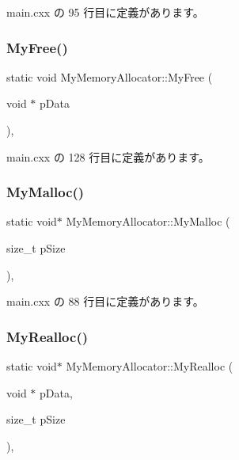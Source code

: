 main.\+cxx の 95 行目に定義があります。

\mbox{\label{class_my_memory_allocator_af96d6b0178ab01af892c68d2cfa23ced}} 
\subsubsection{\texorpdfstring{My\+Free()}{MyFree()}}
{\footnotesize\ttfamily static void My\+Memory\+Allocator\+::\+My\+Free (\begin{DoxyParamCaption}\item[{void $\ast$}]{p\+Data }\end{DoxyParamCaption})\hspace{0.3cm}{\ttfamily [inline]}, {\ttfamily [static]}}



 main.\+cxx の 128 行目に定義があります。

\mbox{\label{class_my_memory_allocator_ab04e127ff4f952b64294f31a80997860}} 
\subsubsection{\texorpdfstring{My\+Malloc()}{MyMalloc()}}
{\footnotesize\ttfamily static void$\ast$ My\+Memory\+Allocator\+::\+My\+Malloc (\begin{DoxyParamCaption}\item[{size\+\_\+t}]{p\+Size }\end{DoxyParamCaption})\hspace{0.3cm}{\ttfamily [inline]}, {\ttfamily [static]}}



 main.\+cxx の 88 行目に定義があります。

\mbox{\label{class_my_memory_allocator_a1ab26aac36e046c768e9a1c8a55d1d32}} 
\subsubsection{\texorpdfstring{My\+Realloc()}{MyRealloc()}}
{\footnotesize\ttfamily static void$\ast$ My\+Memory\+Allocator\+::\+My\+Realloc (\begin{DoxyParamCaption}\item[{void $\ast$}]{p\+Data,  }\item[{size\+\_\+t}]{p\+Size }\end{DoxyParamCaption})\hspace{0.3cm}{\ttfamily [inline]}, {\ttfamily [static]}}




